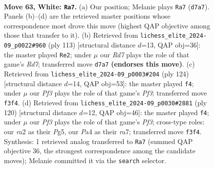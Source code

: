 \documentclass[11pt]{article}
\begin{document}
\clearpage

\begin{figure}[p]\centering
\begin{subfigure}{0.46\textwidth}\centering
\resizebox{\linewidth}{!}{%
\newchessgame
\chessboard[
  setfen={1R6/3R1pk1/4p3/8/P3P3/4KP2/r7/8 w - - 17 63},
  showmover=false,
  pgfstyle=straightmove, color=movearrow, markmove={d7-a7}
]}
\caption{}
\end{subfigure}\hfill
\begin{subfigure}{0.46\textwidth}\centering
\resizebox{\linewidth}{!}{%
\newchessgame
\chessboard[
  setfen={8/8/R7/4pk2/5p2/5P2/3r2PK/8 b - - 15 57},
  showmover=false,
  pgfstyle=straightmove, color=movearrow, markmove={d2-e2}
]}
\caption{}
\end{subfigure}
\\[4pt]
\begin{subfigure}{0.46\textwidth}\centering
\resizebox{\linewidth}{!}{%
\newchessgame
\chessboard[
  setfen={8/7r/5p2/3kp2P/6PK/5P2/4R3/8 w - - 7 63},
  showmover=false,
  pgfstyle=straightmove, color=movearrow, markmove={f3-f4}
]}
\caption{}
\end{subfigure}\hfill
\begin{subfigure}{0.46\textwidth}\centering
\resizebox{\linewidth}{!}{%
\newchessgame
\chessboard[
  setfen={8/r7/8/1k4Pp/p6P/5PK1/R7/8 w - - 0 61},
  showmover=false,
  pgfstyle=straightmove, color=movearrow, markmove={f3-f4}
]}
\caption{}
\end{subfigure}
\caption{\textbf{Move 63, White: \texttt{Ra7}.} (a) Our position; Melanie plays \texttt{Ra7} (\texttt{d7a7}). Panels (b)--(d) are the retrieved master positions whose correspondence most drove this move (highest QAP objective among those that transfer to it). (b) Retrieved from \texttt{lichess\_elite\_2024-09\_p0022\#960} (ply 113) [structural distance $d$=13, QAP obj=36]: the master played \texttt{Re2}; under $\mu$ our \emph{Rd7} plays the role of that game's \emph{Rd7}; transferred move \texttt{d7a7} \textbf{(endorses this move)}. (c) Retrieved from \texttt{lichess\_elite\_2024-09\_p0003\#204} (ply 124) [structural distance $d$=14, QAP obj=53]: the master played \texttt{f4}; under $\mu$ our \emph{Pf3} plays the role of that game's \emph{Pf3}; transferred move \texttt{f3f4}. (d) Retrieved from \texttt{lichess\_elite\_2024-09\_p0030\#2881} (ply 120) [structural distance $d$=12, QAP obj=46]: the master played \texttt{f4}; under $\mu$ our \emph{Pf3} plays the role of that game's \emph{Pf3}; cross-type roles: our \emph{r}a2 as their \emph{P}g5, our \emph{P}a4 as their \emph{r}a7; transferred move \texttt{f3f4}. Synthesis: 1 retrieved analog transferred to \texttt{Ra7} (summed QAP objective 36, the strongest correspondence among the candidate moves); Melanie committed it via the \texttt{search} selector.}
\label{fig:thought-m124}
\end{figure}
\end{document}
